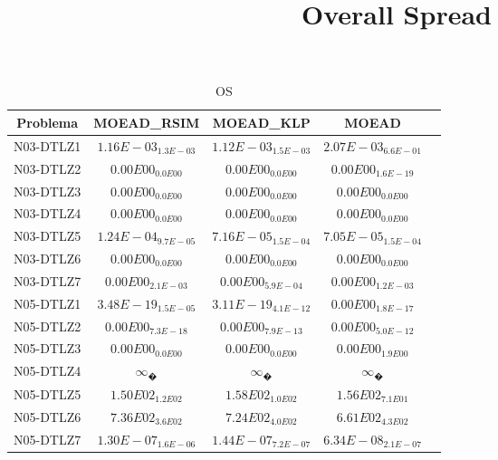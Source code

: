 \documentclass{article}
\title{Overall Spread}
\author{}
\begin{document}
\maketitle
\begin{table*}[ht!]
\scriptsize
\caption{OS}
\centering\begin{tabular}{|c||c||c||c||c|} \hline
Problema &MOEAD_RSIM &MOEAD_KLP &MOEAD\\\hline
N03-DTLZ1 &\cellcolor{gray25}$1.16E-03_{1.3E-03}$ &$1.12E-03_{1.5E-03}$ &\cellcolor{gray95}$2.07E-03_{6.6E-01}$\\ 
\hline
N03-DTLZ2 &\cellcolor{gray95}$0.00E00_{0.0E00}$ &\cellcolor{gray25}$0.00E00_{0.0E00}$ &$0.00E00_{1.6E-19}$\\ 
\hline
N03-DTLZ3 &\cellcolor{gray95}$0.00E00_{0.0E00}$ &\cellcolor{gray25}$0.00E00_{0.0E00}$ &$0.00E00_{0.0E00}$\\ 
\hline
N03-DTLZ4 &\cellcolor{gray95}$0.00E00_{0.0E00}$ &\cellcolor{gray25}$0.00E00_{0.0E00}$ &$0.00E00_{0.0E00}$\\ 
\hline
N03-DTLZ5 &\cellcolor{gray95}$1.24E-04_{9.7E-05}$ &\cellcolor{gray25}$7.16E-05_{1.5E-04}$ &$7.05E-05_{1.5E-04}$\\ 
\hline
N03-DTLZ6 &\cellcolor{gray95}$0.00E00_{0.0E00}$ &\cellcolor{gray25}$0.00E00_{0.0E00}$ &$0.00E00_{0.0E00}$\\ 
\hline
N03-DTLZ7 &$0.00E00_{2.1E-03}$ &\cellcolor{gray95}$0.00E00_{5.9E-04}$ &\cellcolor{gray25}$0.00E00_{1.2E-03}$\\ 
\hline
N05-DTLZ1 &\cellcolor{gray95}$3.48E-19_{1.5E-05}$ &\cellcolor{gray25}$3.11E-19_{4.1E-12}$ &$0.00E00_{1.8E-17}$\\ 
\hline
N05-DTLZ2 &\cellcolor{gray95}$0.00E00_{7.3E-18}$ &\cellcolor{gray25}$0.00E00_{7.9E-13}$ &$0.00E00_{5.0E-12}$\\ 
\hline
N05-DTLZ3 &\cellcolor{gray95}$0.00E00_{0.0E00}$ &\cellcolor{gray25}$0.00E00_{0.0E00}$ &$0.00E00_{1.9E00}$\\ 
\hline
N05-DTLZ4 &\cellcolor{gray95}$∞_{�}$ &\cellcolor{gray25}$∞_{�}$ &$∞_{�}$\\ 
\hline
N05-DTLZ5 &$1.50E02_{1.2E02}$ &\cellcolor{gray95}$1.58E02_{1.0E02}$ &\cellcolor{gray25}$1.56E02_{7.1E01}$\\ 
\hline
N05-DTLZ6 &\cellcolor{gray95}$7.36E02_{3.6E02}$ &\cellcolor{gray25}$7.24E02_{4.0E02}$ &$6.61E02_{4.3E02}$\\ 
\hline
N05-DTLZ7 &\cellcolor{gray25}$1.30E-07_{1.6E-06}$ &\cellcolor{gray95}$1.44E-07_{7.2E-07}$ &$6.34E-08_{2.1E-07}$\\ 

\end{tabular}
\end{table*}
\end{document}
